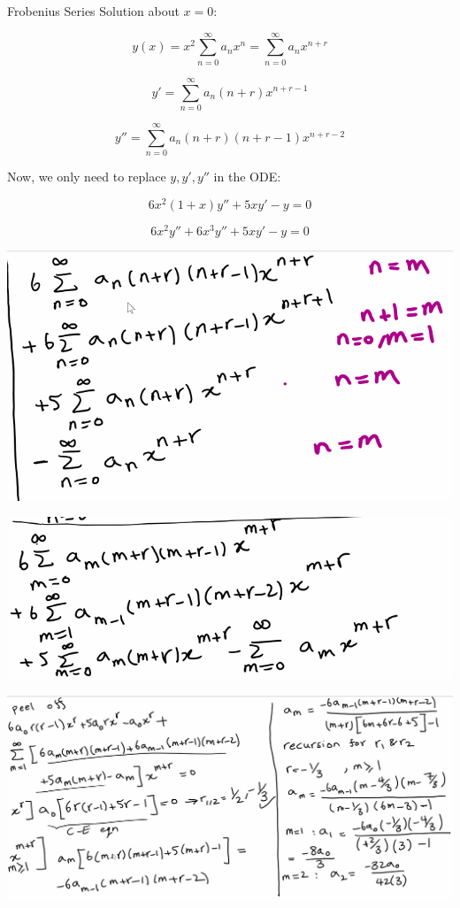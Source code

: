 \hfill \break 

Frobenius Series Solution about $x = 0$:

$$y(x) = x^2 \sum_{n = 0}^{\infty} a_n x^n = \sum_{n = 0}^{\infty} a_n x^{n+r}$$

$$y' = \sum_{n = 0}^{\infty} a_n (n+r) x^{n+r-1}$$

$$y'' = \sum_{n = 0}^{\infty} a_n (n+r)(n+r-1) x^{n+r-2}$$

Now, we only need to replace $y, y', y''$ in the ODE:

$$6x^2(1+x) y'' + 5xy' - y = 0$$

$$6x^2 y'' + 6x^3 y'' + 5xy' - y = 0$$

\includegraphics[width = 0.95 \textwidth]{image4.png}

\includegraphics[width = 0.95 \textwidth]{image5.png}

\includegraphics[width = 0.95 \textwidth]{image6.png}

